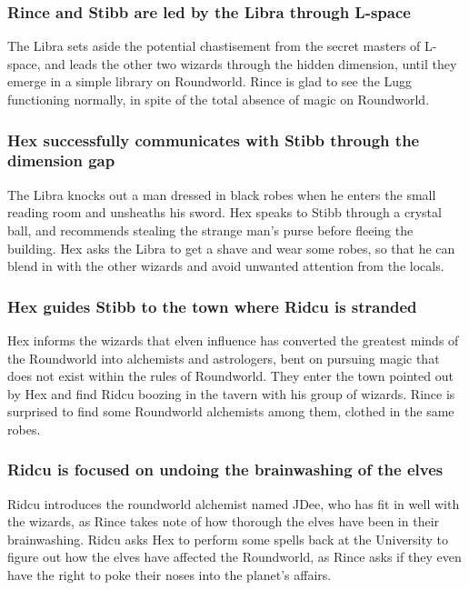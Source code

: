 \subsubsection{\Gls{Rince} and \Gls{Stibb} are led by the \Gls{Libra} through L-space}
The \Gls{Libra} sets aside the potential chastisement from the secret masters of L-space, and leads
the other two wizards through the hidden dimension, until they emerge in a simple library on
Roundworld. \Gls{Rince} is glad to see the \Gls{Lugg} functioning normally, in spite of the total
absence of magic on Roundworld.

\subsubsection{\Gls{Hex} successfully communicates with \Gls{Stibb} through the dimension gap}
The \Gls{Libra} knocks out a man dressed in black robes when he enters the small reading room and
unsheaths his sword. \Gls{Hex} speaks to \Gls{Stibb} through a crystal ball, and recommends stealing
the strange man's purse before fleeing the building. \Gls{Hex} asks the \Gls{Libra} to get a shave
and wear some robes, so that he can blend in with the other wizards and avoid unwanted attention
from the locals.

\subsubsection{\Gls{Hex} guides \Gls{Stibb} to the town where \Gls{Ridcu} is stranded}
\Gls{Hex} informs the wizards that elven influence has converted the greatest minds of the
Roundworld into alchemists and astrologers, bent on pursuing magic that does not exist within the
rules of Roundworld. They enter the town pointed out by \Gls{Hex} and find \Gls{Ridcu} boozing in
the tavern with his group of wizards. \Gls{Rince} is surprised to find some Roundworld alchemists
among them, clothed in the same robes.

\subsubsection{\Gls{Ridcu} is focused on undoing the brainwashing of the elves}
\Gls{Ridcu} introduces the roundworld alchemist named \Gls{JDee}, who has fit in well with the
wizards, as \Gls{Rince} takes note of how thorough the elves have been in their brainwashing.
\Gls{Ridcu} asks \Gls{Hex} to perform some spells back at the University to figure out how the
elves have affected the Roundworld, as \Gls{Rince} asks if they even have the right to poke their
noses into the planet's affairs.

